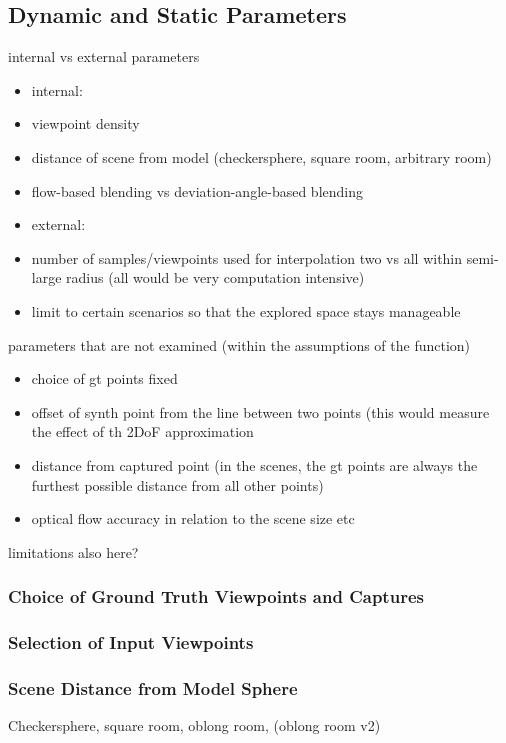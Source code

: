 \subsection{Dynamic and Static Parameters}
internal vs external parameters
\begin{itemize}
  \item internal:
  \item viewpoint density
  \item distance of scene from model (checkersphere, square room, arbitrary room)
  \item flow-based blending vs deviation-angle-based blending
  \item external:
  \item number of samples/viewpoints used for interpolation \ar two vs all within semi-large radius (all would be very computation intensive)
  \item limit to certain scenarios so that the explored space stays manageable
\end{itemize}

parameters that are not examined (within the assumptions of the function)
\begin{itemize}
  \item choice of gt points \ar fixed
  \item \ar offset of synth point from the line between two points (this would measure the effect of th 2DoF approximation
  \item distance from captured point (in the scenes, the gt points are always the furthest possible distance from all other points)
  \item optical flow accuracy in relation to the scene size etc
\end{itemize}
limitations also here?

\subsubsection{Choice of Ground Truth Viewpoints and Captures}

\subsubsection{Selection of Input Viewpoints}

\subsubsection{Scene Distance from Model Sphere}
Checkersphere, square room, oblong room, (oblong room v2)

